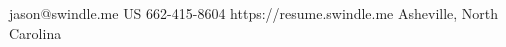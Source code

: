 \profile
{\yourname}
{jason@swindle.me}
{US}
{662-415-8604}
{https://resume.swindle.me}
{Asheville, North Carolina}